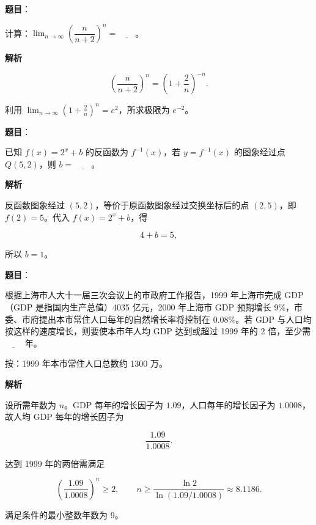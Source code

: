 \begin{answer}

\textbf{题目}：

计算：$\displaystyle\lim_{n\to\infty}\left(\dfrac{n}{n+2}\right)^n=\underline{\qquad}$。

\textbf{解析}

\nopagebreak[4]
\[
\left(\frac{n}{n+2}\right)^n
=\left(1+\frac2n\right)^{-n}.
\]

利用 $\lim_{n\to\infty}(1+\frac2n)^n=e^2$，所求极限为 $e^{-2}$。


\end{answer}
\begin{answer}

\textbf{题目}：

已知 $f(x)=2^x+b$ 的反函数为 $f^{-1}(x)$，若 $y=f^{-1}(x)$ 的图象经过点 $Q(5,2)$，则 $b=\underline{\qquad}$。

\textbf{解析}

反函数图象经过 $(5,2)$，等价于原函数图象经过交换坐标后的点 $(2,5)$，即 $f(2)=5$。代入 $f(x)=2^x+b$，得

\nopagebreak[4]
\[
4+b=5,
\]

所以 $b=1$。


\end{answer}
\begin{answer}

\textbf{题目}：

根据上海市人大十一届三次会议上的市政府工作报告，1999 年上海市完成 GDP（GDP 是指国内生产总值）4035 亿元，2000 年上海市 GDP 预期增长 9\%，市委、市府提出本市常住人口每年的自然增长率将控制在 0.08\%。若 GDP 与人口均按这样的速度增长，则要使本市年人均 GDP 达到或超过 1999 年的 2 倍，至少需 $\underline{\qquad}$ 年。

按：1999 年本市常住人口总数约 1300 万。

\textbf{解析}

设所需年数为 $n$。GDP 每年的增长因子为 $1.09$，人口每年的增长因子为 $1.0008$，故人均 GDP 每年的增长因子为

\nopagebreak[4]
\[
\frac{1.09}{1.0008}.
\]

达到 1999 年的两倍需满足

\nopagebreak[4]
\[
\left(\frac{1.09}{1.0008}\right)^n\ge2,
\qquad
n\ge\frac{\ln2}{\ln(1.09/1.0008)}\approx8.1186.
\]

满足条件的最小整数年数为 $9$。


\end{answer}
